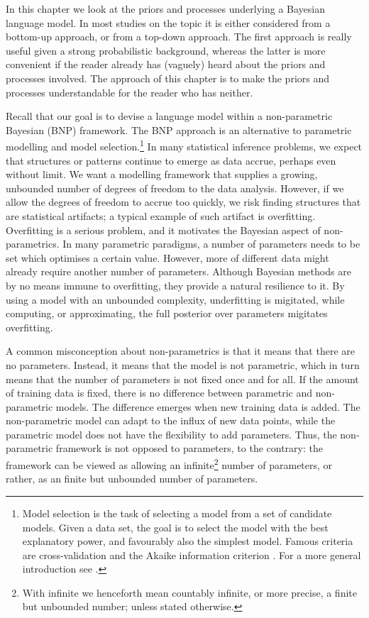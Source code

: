 In this chapter we look at the priors and processes underlying a Bayesian language model. In most studies on the topic it is either considered from a bottom-up approach, or from a top-down approach. The first approach is really useful given a strong probabilistic background, whereas the latter is more convenient if the reader already has (vaguely) heard about the priors and processes involved. The approach of this chapter is to make the priors and processes understandable for the reader who has neither.

Recall that our goal is to devise a language model within a non-parametric Bayesian (BNP) framework. The BNP approach is an alternative to parametric modelling and model selection.\footnote[][1em]{Model selection is the task of selecting a model from a set of candidate models. Given a data set, the goal is to select the model with the best explanatory power, and favourably also the simplest model. Famous criteria are cross-validation \citep{Kohavi1995A} and the Akaike information criterion \citep{Bozdogan1987Model}. For a more general introduction see \citep{Burnham2002Model}.}
In many statistical inference problems, we expect that structures or patterns continue to emerge as data accrue, perhaps even without limit. We want a modelling framework that supplies a growing, unbounded number of degrees of freedom to the data analysis. However, if we allow the degrees of freedom to accrue too quickly, we risk finding structures that are statistical artifacts; a typical example of such artifact is overfitting. Overfitting is a serious problem, and it motivates the Bayesian aspect of non-parametrics. In many parametric paradigms, a number of parameters needs to be set which optimises a certain value. However, more of different data might already require another number of parameters. 
Although Bayesian methods are by no means immune to overfitting, they provide a natural resilience to it. By using a model with an unbounded complexity, underfitting is migitated, while computing, or approximating, the full posterior over parameters migitates overfitting.

A common misconception about non-parametrics is that it means that there are no parameters. Instead, it means that the model is not parametric, which in turn means that the number of parameters is not fixed once and for all. If the amount of training data is fixed, there is no difference between parametric and non-parametric models. The difference emerges when new training data is added. The non-parametric model can adapt to the influx of new data points, while the parametric model does not have the flexibility to add parameters. Thus, the non-parametric framework is not opposed to parameters, to the contrary: the framework can be viewed as allowing an infinite\footnote{With infinite we henceforth mean countably infinite, or more precise, a finite but unbounded number; unless stated otherwise.} number of parameters, or rather, as an finite but unbounded number of parameters.

